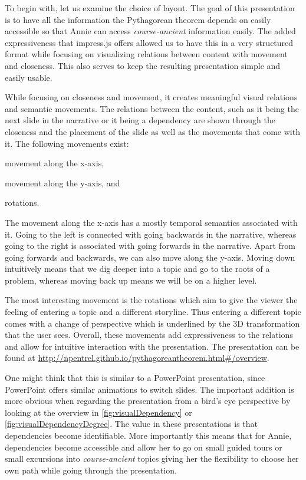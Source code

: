 \documentclass{llncs}
\begin{document}
To begin with, let us examine the choice of layout. The goal of this presentation is to have all the information the Pythagorean theorem depends on easily accessible so that Annie can access \textit{course-ancient} information easily. The added expressiveness that impress.js offers allowed us to have this in a very structured format while focusing on visualizing relations between content with movement and closeness. This also serves to keep the resulting presentation simple and easily usable.

While focusing on closeness and movement, it creates meaningful visual relations and semantic movements. The relations between the content, such as it being the next slide in the narrative or it being a dependency are shown through the closeness and the placement of the slide as well as the movements that come with it. The following movements exist:
\begin{inparaenum}[\em a\rm)]
\item movement along the x-axis,
\item movement along the y-axis, and
\item rotations.
\end{inparaenum}

The movement along the x-axis has a mostly temporal semantics associated with it. Going to the left is connected with going backwards in the narrative, whereas going to the right is associated with going forwards in the narrative. Apart from going forwards and backwards, we can also move along the y-axis. Moving down intuitively means that we dig deeper into a topic and go to the roots of a problem, whereas moving back up means we will be on a higher level.

The most interesting movement is the rotations which aim to give the viewer the feeling of
entering a topic and a different storyline. Thus entering a different topic comes with a
change of perspective which is underlined by the 3D transformation that the user
sees. Overall, these movements add expressiveness to the relations and allow for intuitive
interaction with the presentation. The presentation can be found at
\url{http://npentrel.github.io/pythagoreantheorem.html\#/overview}.

One might think that this is similar to a PowerPoint presentation, since PowerPoint offers
similar animations to switch slides. The important addition is more obvious when regarding
the presentation from a bird's eye perspective by looking at the overview in
\autoref{fig:visualDependency} or \autoref{fig:visualDependencyDegree}. The value in these
presentations is that dependencies become identifiable. More importantly this means that
for Annie, dependencies become accessible and allow her to go on small guided tours or
small excursions into \textit{course-ancient} topics giving her the flexibility to choose
her own path while going through the presentation.
\end{document}
